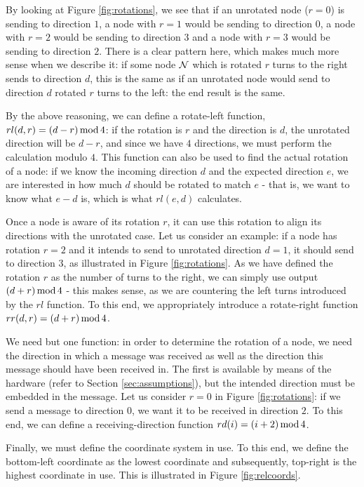 By looking at Figure \ref{fig:rotations}, we see that if an unrotated node ($r = 0$) is sending to direction $1$, a node with $r = 1$ would be sending to direction $0$, a node with $r = 2$ would be sending to direction $3$ and a node with $r = 3$ would be sending to direction $2$. There is a clear pattern here, which makes much more sense when we describe it: if some node $\mathcal{N}$ which is rotated $r$ turns to the right sends to direction $d$, this is the same as if an unrotated node would send to direction $d$ rotated $r$ turns to the left: the end result is the same.

By the above reasoning, we can define a rotate-left function, $rl(d,r) = (d - r) \operatorname{mod} 4$: if the rotation is $r$ and the direction is $d$, the unrotated direction will be $d - r$, and since we have $4$ directions, we must perform the calculation modulo $4$. This function can also be used to find the actual rotation of a node: if we know the incoming direction $d$ and the expected direction $e$, we are interested in how much $d$ should be rotated to match $e$ - that is, we want to know what $e - d$ is, which is what $rl(e,d)$ calculates.

Once a node is aware of its rotation $r$, it can use this rotation to align its directions with the unrotated case. Let us consider an example: if a node has rotation $r = 2$ and it intends to send to unrotated direction $d = 1$, it should send to direction $3$, as illustrated in Figure \ref{fig:rotations}. As we have defined the rotation $r$ as the number of turns to the right, we can simply use output $(d + r) \operatorname{mod} 4$ - this makes sense, as we are countering the left turns introduced by the $rl$ function. To this end, we appropriately introduce a rotate-right function $rr(d,r) = (d + r) \operatorname{mod} 4$.

We need but one function: in order to determine the rotation of a node, we need the direction in which a message was received as well as the direction this message should have been received in. The first is available by means of the hardware (refer to Section \ref{sec:assumptions}), but the intended direction must be embedded in the message. Let us consider $r = 0$ in Figure \ref{fig:rotations}: if we send a message to direction $0$, we want it to be received in direction $2$. To this end, we can define a receiving-direction function $rd(i) = (i + 2) \operatorname{mod} 4$.

Finally, we must define the coordinate system in use. To this end, we define the bottom-left coordinate as the lowest coordinate and subsequently, top-right is the highest coordinate in use. This is illustrated in Figure \ref{fig:relcoords}.


